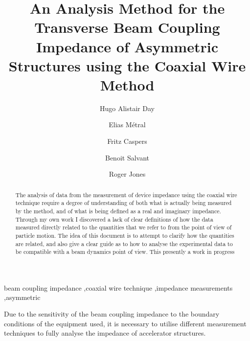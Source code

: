 \documentclass[review, number, sort&compress]{elsarticle}
\begin{document}
%

\begin{frontmatter}
\title{An Analysis Method for the Transverse Beam Coupling Impedance of Asymmetric Structures using the Coaxial Wire Method}

\author[manchester,cockcroft,cern]{Hugo Alistair Day}
\author[cern]{Elias Métral}
\author[cern]{Fritz Caspers}
\author[cern]{Benoit Salvant}
\author[manchester,cockcroft]{Roger Jones}


\address[manchester]{School of Physics and Astronomy, The University of Manchester, Oxford Road, 
Manchester, M13 9PL, UK}
\address[cockcroft]{Cockcroft Institute of Science and Technology, 
Daresbury, WA4 4AD, UK}
\address[cern]{CERN-European Organization for Nuclear Research, 
Geneva, Switzerland}

\begin{keyword}
beam coupling impedance \sep coaxial wire technique \sep impedance measurements \sep asymmetric
\end{keyword}

\begin{abstract}
The analysis of data from the measurement of device impedance using the coaxial wire technique require a degree of understanding of both what is actually being measured by the method, and of what is being defined as a real and imaginary impedance. Through my own work I discovered a lack of clear definitions of how the data measured directly related to the quantities that we refer to from the point of view of particle motion. The idea of this document is to attempt to clarify how the quantities are related, and also give a clear guide as to how to analyse the experimental data to be compatible with a beam dynamics point of view. This presently a work in progress
\end{abstract}

\end{frontmatter}

\newpage


%



Due to the sensitivity of the beam coupling impedance to the boundary conditions of the equipment used, it is necessary to utilise different measurement techniques to fully analyse the impedance of accelerator structures.
\end{document}
